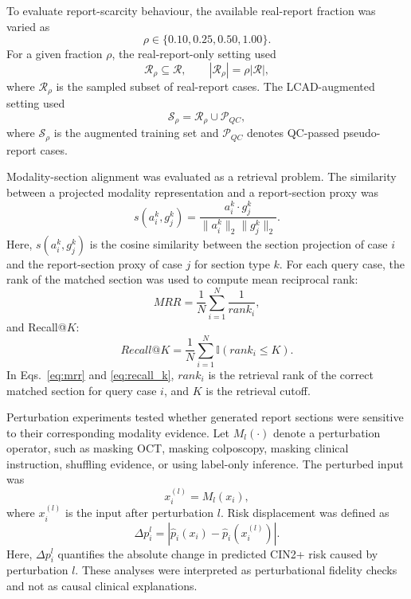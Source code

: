To evaluate report-scarcity behaviour, the available real-report fraction was varied as
\begin{equation}
\rho\in\{0.10,0.25,0.50,1.00\}.
\label{eq:scarcity_fraction}
\end{equation}
For a given fraction \(\rho\), the real-report-only setting used
\begin{equation}
\mathcal{R}_{\rho}\subseteq\mathcal{R},
\qquad
|\mathcal{R}_{\rho}|=\rho|\mathcal{R}|,
\label{eq:scarcity_real}
\end{equation}
where \(\mathcal{R}_{\rho}\) is the sampled subset of real-report cases. The LCAD-augmented setting used
\begin{equation}
\mathcal{S}_{\rho}=\mathcal{R}_{\rho}\cup\mathcal{P}_{QC},
\label{eq:scarcity_augmented}
\end{equation}
where \(\mathcal{S}_{\rho}\) is the augmented training set and \(\mathcal{P}_{QC}\) denotes QC-passed pseudo-report cases.

Modality-section alignment was evaluated as a retrieval problem. The similarity between a projected modality representation and a report-section proxy was
\begin{equation}
s(a_i^k,g_j^k)
=
\frac{a_i^k\cdot g_j^k}{\|a_i^k\|_2\|g_j^k\|_2}.
\label{eq:retrieval_similarity}
\end{equation}
Here, \(s(a_i^k,g_j^k)\) is the cosine similarity between the section projection of case \(i\) and the report-section proxy of case \(j\) for section type \(k\). For each query case, the rank of the matched section was used to compute mean reciprocal rank:
\begin{equation}
MRR=\frac{1}{N}\sum_{i=1}^{N}\frac{1}{rank_i},
\label{eq:mrr}
\end{equation}
and Recall@\(K\):
\begin{equation}
Recall@K=\frac{1}{N}\sum_{i=1}^{N}\mathbb{I}(rank_i\leq K).
\label{eq:recall_k}
\end{equation}
In Eqs.~\eqref{eq:mrr} and \eqref{eq:recall_k}, \(rank_i\) is the retrieval rank of the correct matched section for query case \(i\), and \(K\) is the retrieval cutoff.

Perturbation experiments tested whether generated report sections were sensitive to their corresponding modality evidence. Let \(M_l(\cdot)\) denote a perturbation operator, such as masking OCT, masking colposcopy, masking clinical instruction, shuffling evidence, or using label-only inference. The perturbed input was
\begin{equation}
x_i^{(l)}=M_l(x_i),
\label{eq:perturb_input}
\end{equation}
where \(x_i^{(l)}\) is the input after perturbation \(l\). Risk displacement was defined as
\begin{equation}
\Delta p_i^{l}=|\hat{p}_i(x_i)-\hat{p}_i(x_i^{(l)})|.
\label{eq:risk_shift}
\end{equation}
Here, \(\Delta p_i^l\) quantifies the absolute change in predicted CIN2+ risk caused by perturbation \(l\). These analyses were interpreted as perturbational fidelity checks and not as causal clinical explanations.


